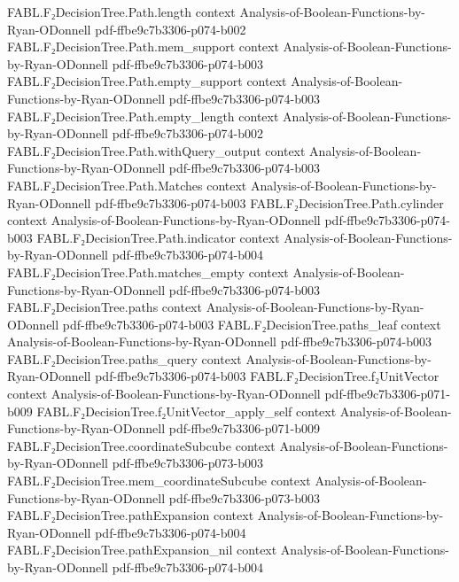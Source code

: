 \begin{theorem}
\proofstep
  {FABL.F₂DecisionTree.Path.length}
  {context}
  {Analysis-of-Boolean-Functions-by-Ryan-ODonnell}
  {pdf-ffbe9c7b3306-p074-b002}
\proofstep
  {FABL.F₂DecisionTree.Path.mem_support}
  {context}
  {Analysis-of-Boolean-Functions-by-Ryan-ODonnell}
  {pdf-ffbe9c7b3306-p074-b003}
\proofstep
  {FABL.F₂DecisionTree.Path.empty_support}
  {context}
  {Analysis-of-Boolean-Functions-by-Ryan-ODonnell}
  {pdf-ffbe9c7b3306-p074-b003}
\proofstep
  {FABL.F₂DecisionTree.Path.empty_length}
  {context}
  {Analysis-of-Boolean-Functions-by-Ryan-ODonnell}
  {pdf-ffbe9c7b3306-p074-b002}
\proofstep
  {FABL.F₂DecisionTree.Path.withQuery_output}
  {context}
  {Analysis-of-Boolean-Functions-by-Ryan-ODonnell}
  {pdf-ffbe9c7b3306-p074-b003}
\proofstep
  {FABL.F₂DecisionTree.Path.Matches}
  {context}
  {Analysis-of-Boolean-Functions-by-Ryan-ODonnell}
  {pdf-ffbe9c7b3306-p074-b003}
\proofstep
  {FABL.F₂DecisionTree.Path.cylinder}
  {context}
  {Analysis-of-Boolean-Functions-by-Ryan-ODonnell}
  {pdf-ffbe9c7b3306-p074-b003}
\proofstep
  {FABL.F₂DecisionTree.Path.indicator}
  {context}
  {Analysis-of-Boolean-Functions-by-Ryan-ODonnell}
  {pdf-ffbe9c7b3306-p074-b004}
\proofstep
  {FABL.F₂DecisionTree.Path.matches_empty}
  {context}
  {Analysis-of-Boolean-Functions-by-Ryan-ODonnell}
  {pdf-ffbe9c7b3306-p074-b003}
\proofstep
  {FABL.F₂DecisionTree.paths}
  {context}
  {Analysis-of-Boolean-Functions-by-Ryan-ODonnell}
  {pdf-ffbe9c7b3306-p074-b003}
\proofstep
  {FABL.F₂DecisionTree.paths_leaf}
  {context}
  {Analysis-of-Boolean-Functions-by-Ryan-ODonnell}
  {pdf-ffbe9c7b3306-p074-b003}
\proofstep
  {FABL.F₂DecisionTree.paths_query}
  {context}
  {Analysis-of-Boolean-Functions-by-Ryan-ODonnell}
  {pdf-ffbe9c7b3306-p074-b003}
\proofstep
  {FABL.F₂DecisionTree.f₂UnitVector}
  {context}
  {Analysis-of-Boolean-Functions-by-Ryan-ODonnell}
  {pdf-ffbe9c7b3306-p071-b009}
\proofstep
  {FABL.F₂DecisionTree.f₂UnitVector_apply_self}
  {context}
  {Analysis-of-Boolean-Functions-by-Ryan-ODonnell}
  {pdf-ffbe9c7b3306-p071-b009}
\proofstep
  {FABL.F₂DecisionTree.coordinateSubcube}
  {context}
  {Analysis-of-Boolean-Functions-by-Ryan-ODonnell}
  {pdf-ffbe9c7b3306-p073-b003}
\proofstep
  {FABL.F₂DecisionTree.mem_coordinateSubcube}
  {context}
  {Analysis-of-Boolean-Functions-by-Ryan-ODonnell}
  {pdf-ffbe9c7b3306-p073-b003}
\proofstep
  {FABL.F₂DecisionTree.pathExpansion}
  {context}
  {Analysis-of-Boolean-Functions-by-Ryan-ODonnell}
  {pdf-ffbe9c7b3306-p074-b004}
\proofstep
  {FABL.F₂DecisionTree.pathExpansion_nil}
  {context}
  {Analysis-of-Boolean-Functions-by-Ryan-ODonnell}
  {pdf-ffbe9c7b3306-p074-b004}

\end{theorem}
